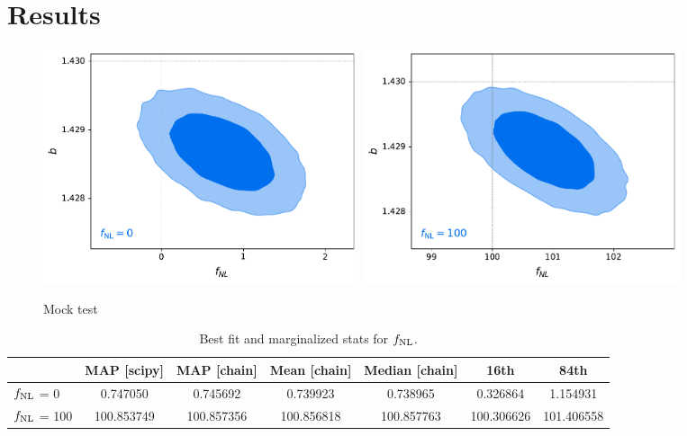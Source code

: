 \section{Results}\label{sec:results}

\begin{figure}
    \centering
    \includegraphics[width=0.45\textwidth]{figures/mcmc_zero.pdf} 
    \includegraphics[width=0.45\textwidth]{figures/mcmc_po100.pdf} 
    \caption{Mock test}\label{fig:mcmc_mocks}
\end{figure}


\begin{table}
  \begin{center}
    \caption{Best fit and marginalized  stats for $f_{\rm NL}$.}
    \label{tab:mocksmcmc}
    \begin{tabular}{lcccccc}
    \hline
    \hline
    & MAP [scipy] & MAP [chain]  &	Mean [chain]	& Median [chain] &	16th	& 84th \\
    \hline
    $f_{\rm NL}$ = 0	& 0.747050	& 0.745692	& 0.739923	& 0.738965	& 0.326864	& 1.154931 \\
    $f_{\rm NL}$ = 100	& 100.853749	& 100.857356	& 100.856818	& 100.857763	& 100.306626	& 101.406558
    \end{tabular}
  \end{center}
\end{table}



